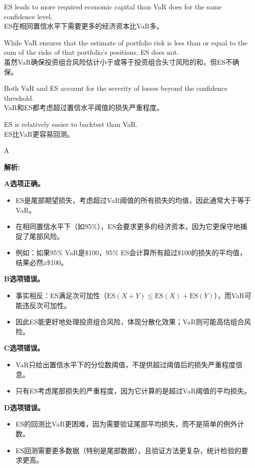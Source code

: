 \documentclass{article}
\newenvironment{explanation}
{\textbf{解析:}\par}
{\par}
\begin{document}
\begin{choices}
    \item ES leads to more required economic capital than VaR does for the same confidence level.\\
        ES在相同置信水平下需要更多的经济资本比VaR多。
    \item While VaR ensures that the estimate of portfolio risk is less than or equal to the sum of the risks of that portfolio's positions, ES does not.\\
        虽然VaR确保投资组合风险估计小于或等于投资组合头寸风险的和，但ES不确保。
    \item Both VaR and ES account for the severity of losses beyond the confidence threshold.\\
        VaR和ES都考虑超过置信水平阈值的损失严重程度。
    \item ES is relatively easier to backtest than VaR.\\
        ES比VaR更容易回测。
\end{choices}

\begin{correctanswer}
    A
\end{correctanswer}

\begin{explanation}

    \textbf{A选项正确。}
    \begin{itemize}
        \item ES是尾部期望损失，考虑超过VaR阈值的所有损失的均值，因此通常大于等于VaR。
        \item 在相同置信水平下（如95\%），ES会要求更多的经济资本，因为它更保守地捕捉了尾部风险。
        \item 例如：如果95\% VaR是\$100，95\% ES会计算所有超过\$100的损失的平均值，结果必然≥\$100。
    \end{itemize}

    \textbf{B选项错误。}
    \begin{itemize}
        \item 事实相反：ES满足次可加性（$\text{ES}(X+Y)\leq\text{ES}(X)+\text{ES}(Y)$），而VaR可能违反次可加性。
        \item 因此ES能更好地处理投资组合风险，体现分散化效果；VaR则可能高估组合风险。
    \end{itemize}

    \textbf{C选项错误。}
    \begin{itemize}
        \item VaR只给出置信水平下的分位数阈值，不提供超过阈值后的损失严重程度信息。
        \item 只有ES考虑尾部损失的严重程度，因为它计算的是超过VaR阈值的平均损失。
    \end{itemize}

    \textbf{D选项错误。}
    \begin{itemize}
        \item ES的回测比VaR更困难，因为需要验证尾部平均损失，而不是简单的例外计数。
        \item ES回测需要更多数据（特别是尾部数据），且验证方法更复杂，统计检验的要求更高。
    \end{itemize}

\end{explanation}
\end{document}
